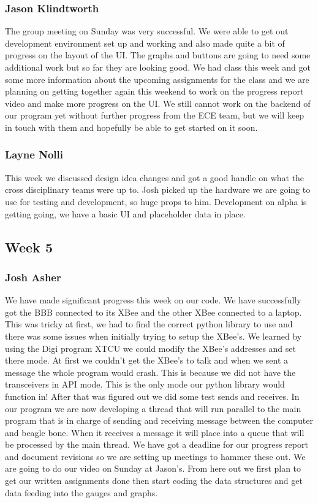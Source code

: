 \documentclass[10pt,draftclsnofoot,onecolumn]{IEEEtran}
\begin{document}
\subsubsection{Jason Klindtworth}
The group meeting on Sunday was very successful. We were able to get out development environment set up and working and also made quite a bit of progress on the layout of the UI. The graphs and buttons are going to need some additional work but so far they are looking good. We had class this week and got some more information about the upcoming assignments for the class and we are planning on getting together again this weekend to work on the progress report video and make more progress on the UI. We still cannot work on the backend of our program yet without further progress from the ECE team, but we will keep in touch with them and hopefully be able to get started on it soon. \par

\subsubsection{Layne Nolli}
This week we discussed design idea changes and got a good handle on what the cross disciplinary teams were up to. Josh picked up the hardware we are going to use for testing and development, so huge props to him. Development on alpha is getting going, we have a basic UI and placeholder data in place. \par

\subsection{Week 5}
\subsubsection{Josh Asher}
We have made significant progress this week on our code. We have successfully got the BBB connected to its XBee and the other XBee connected to a laptop. This was tricky at first, we had to find the correct python library to use and there was some issues when initially trying to setup the XBee's. We learned by using the Digi program XTCU we could modify the XBee's addresses and set there mode. At first we couldn't get the XBee's to talk and when we sent a message the whole program would crash. This is because we did not have the transceivers in API mode. This is the only mode our python library would function in! After that was figured out we did some test sends and receives. In our program we are now developing a thread that will run parallel to the main program that is in charge of sending and receiving message between the computer and beagle bone. When it receives a message it will place into a queue that will be processed by the main thread. We have got a deadline for our progress report and document revisions so we are setting up meetings to hammer these out. We are going to do our video on Sunday at Jason's. From here out we first plan to get our written assignments done then start coding the data structures and get data feeding into the gauges and graphs. \par
\end{document}

